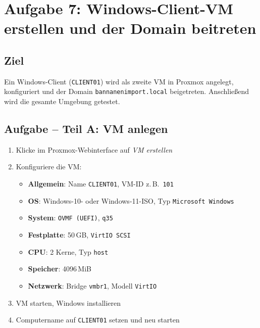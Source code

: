 \documentclass[11pt, oneside, numbers=noenddot]{scrbook}
\begin{document}
\newpage
\section{Aufgabe 7: Windows-Client-VM erstellen und der Domain beitreten}

\subsection*{Ziel}
Ein Windows-Client (\texttt{CLIENT01}) wird als zweite VM in Proxmox angelegt, konfiguriert und der Domain \texttt{bannanenimport.local} beigetreten. Anschließend wird die gesamte Umgebung getestet.

\subsection*{Aufgabe -- Teil A: VM anlegen}
\begin{enumerate}
  \item Klicke im Proxmox-Webinterface auf \textit{VM erstellen}
  \item Konfiguriere die VM:
  \begin{itemize}
    \item \textbf{Allgemein}: Name \texttt{CLIENT01}, VM-ID z.\,B.\ \texttt{101}
    \item \textbf{OS}: Windows-10- oder Windows-11-ISO, Typ \texttt{Microsoft Windows}
    \item \textbf{System}: \texttt{OVMF (UEFI)}, \texttt{q35}
    \item \textbf{Festplatte}: 50\,GB, \texttt{VirtIO SCSI}
    \item \textbf{CPU}: 2 Kerne, Typ \texttt{host}
    \item \textbf{Speicher}: 4096\,MiB
    \item \textbf{Netzwerk}: Bridge \texttt{vmbr1}, Modell \texttt{VirtIO}
  \end{itemize}
  \item VM starten, Windows installieren
  \item Computername auf \texttt{CLIENT01} setzen und neu starten
\end{enumerate}
\end{document}
